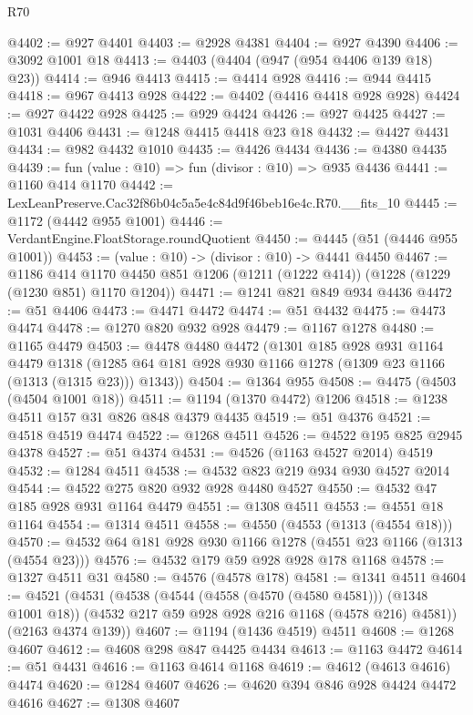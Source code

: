 \begin{lexlean}{R70}
\begin{coremodule}
@4402 := @927 @4401
@4403 := @2928 @4381
@4404 := @927 @4390
@4406 := @3092 @1001 @18
@4413 := @4403 (@4404 (@947 (@954 @4406 @139 @18) @23))
@4414 := @946 @4413
@4415 := @4414 @928
@4416 := @944 @4415
@4418 := @967 @4413 @928
@4422 := @4402 (@4416 @4418 @928 @928)
@4424 := @927 @4422 @928
@4425 := @929 @4424
@4426 := @927 @4425
@4427 := @1031 @4406
@4431 := @1248 @4415 @4418 @23 @18
@4432 := @4427 @4431
@4434 := @982 @4432 @1010
@4435 := @4426 @4434
@4436 := @4380 @4435
@4439 := fun (value : @10) => fun (divisor : @10) => @935 @4436
@4441 := @1160 @414 @1170
@4442 := LexLeanPreserve.Cac32f86b04c5a5e4c84d9f46beb16e4c.R70.__fits_10
@4445 := @1172 (@4442 @955 @1001)
@4446 := VerdantEngine.FloatStorage.roundQuotient
@4450 := @4445 (@51 (@4446 @955 @1001))
@4453 := (value : @10) -> (divisor : @10) -> @4441 @4450
@4467 := @1186
    @414
    @1170
    @4450
    @851
    @1206
    (@1211 (@1222 @414))
    (@1228 (@1229 (@1230 @851) @1170 @1204))
@4471 := @1241 @821 @849 @934 @4436
@4472 := @51 @4406
@4473 := @4471 @4472
@4474 := @51 @4432
@4475 := @4473 @4474
@4478 := @1270 @820 @932 @928
@4479 := @1167 @1278
@4480 := @1165 @4479
@4503 := @4478
    @4480
    @4472
    (@1301
      @185
      @928
      @931
      @1164
      @4479
      @1318
      (@1285 @64 @181 @928 @930 @1166 @1278 (@1309 @23 @1166 (@1313 (@1315 @23))) @1343))
@4504 := @1364 @955
@4508 := @4475 (@4503 (@4504 @1001 @18))
@4511 := @1194 (@1370 @4472) @1206
@4518 := @1238 @4511 @157 @31 @826 @848 @4379 @4435
@4519 := @51 @4376
@4521 := @4518 @4519 @4474
@4522 := @1268 @4511
@4526 := @4522 @195 @825 @2945 @4378
@4527 := @51 @4374
@4531 := @4526 (@1163 @4527 @2014) @4519
@4532 := @1284 @4511
@4538 := @4532 @823 @219 @934 @930 @4527 @2014
@4544 := @4522 @275 @820 @932 @928 @4480 @4527
@4550 := @4532 @47 @185 @928 @931 @1164 @4479
@4551 := @1308 @4511
@4553 := @4551 @18 @1164
@4554 := @1314 @4511
@4558 := @4550 (@4553 (@1313 (@4554 @18)))
@4570 := @4532 @64 @181 @928 @930 @1166 @1278 (@4551 @23 @1166 (@1313 (@4554 @23)))
@4576 := @4532 @179 @59 @928 @928 @178 @1168
@4578 := @1327 @4511 @31
@4580 := @4576 (@4578 @178)
@4581 := @1341 @4511
@4604 := @4521
    (@4531
      (@4538
        (@4544 (@4558 (@4570 (@4580 @4581))) (@1348 @1001 @18))
        (@4532 @217 @59 @928 @928 @216 @1168 (@4578 @216) @4581))
      (@2163 @4374 @139))
@4607 := @1194 (@1436 @4519) @4511
@4608 := @1268 @4607
@4612 := @4608 @298 @847 @4425 @4434
@4613 := @1163 @4472
@4614 := @51 @4431
@4616 := @1163 @4614 @1168
@4619 := @4612 (@4613 @4616) @4474
@4620 := @1284 @4607
@4626 := @4620 @394 @846 @928 @4424 @4472 @4616
@4627 := @1308 @4607

\end{coremodule}
\end{lexlean}
